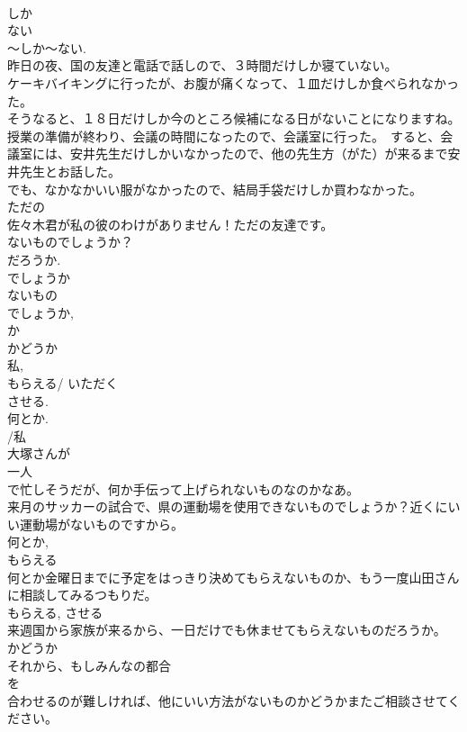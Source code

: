 \documentclass[8pt]{extreport}
\begin{document}
\begin{CJK}{UTF8}{min}
\\	しか~
\\	ない
\\	～しか～ない.
\\	昨日の夜、国の友達と電話で話しので、３時間だけしか寝ていない。
\\	ケーキバイキングに行ったが、お腹が痛くなって、１皿だけしか食べられなかった。
\\	そうなると、１８日だけしか今のところ候補になる日がないことになりますね。
\\	授業の準備が終わり、会議の時間になったので、会議室に行った。　すると、会議室には、安井先生だけしかいなかったので、他の先生方（がた）が来るまで安井先生とお話した。
\\	でも、なかなかいい服がなかったので、結局手袋だけしか買わなかった。
\\	ただの
\\	佐々木君が私の彼のわけがありません！ただの友達です。
\\	ないものでしょうか？
\\	だろうか. 
\\	でしょうか 
\\	ないもの 
\\	でしょうか, 
\\	か 
\\	かどうか 
\\	私, 
\\	もらえる/ いただく
\\	させる. 
\\	何とか. 
\\	/私 
\\	大塚さんが
\\	一人
\\	で忙しそうだが、何か手伝って上げられないものなのかなあ。
\\	来月のサッカーの試合で、県の運動場を使用できないものでしょうか？近くにいい運動場がないものですから。
\\	何とか, 
\\	もらえる 
\\	何とか金曜日までに予定をはっきり決めてもらえないものか、もう一度山田さんに相談してみるつもりだ。
\\	もらえる, させる 
\\	来週国から家族が来るから、一日だけでも休ませてもらえないものだろうか。
\\	かどうか 
\\	それから、もしみんなの都合
\\	を
\\	合わせるのが難しければ、他にいい方法がないものかどうかまたご相談させてください。

\end{CJK}
\end{document}

